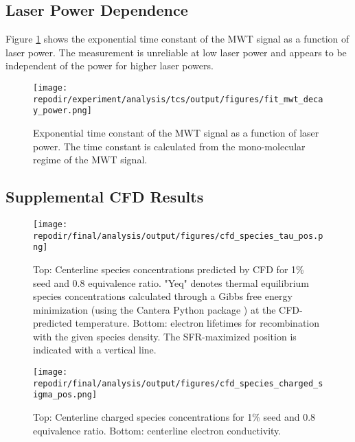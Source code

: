\clearpage
\subsection{Laser Power Dependence}

Figure \ref{fig:SI_fit_mwt_decay_power} shows the exponential time constant of the MWT signal as a function of laser power. The measurement is unreliable at low laser power and appears to be independent of the power for higher laser powers.

\begin{figure}
    \centering
    \texttt{[image: \\repodir/experiment/analysis/tcs/output/figures/fit\_mwt\_decay\_power.png]} 
    \caption{Exponential time constant of the MWT signal as a function of laser power. The time constant is calculated from the mono-molecular regime of the MWT signal.}
    \label{fig:SI_fit_mwt_decay_power}
\end{figure}

\clearpage

\subsection{Supplemental CFD Results}

\begin{figure}[h]
    \texttt{[image: \\repodir/final/analysis/output/figures/cfd\_species\_tau\_pos.png]} 
    \caption{Top: Centerline species concentrations predicted by CFD for 1\% seed and 0.8 equivalence ratio. "Yeq" denotes thermal equilibrium species concentrations calculated through a Gibbs free energy minimization (using the Cantera Python package \cite{goodwinCanteraObjectorientedSoftware2021}) at the CFD-predicted temperature.  Bottom: electron lifetimes for recombination with the given species density. The SFR-maximized position is indicated with a vertical line.}
    \label{fig:SI_cfd_species_tau_pos}
\end{figure}



\begin{figure}[h]
    \texttt{[image: \\repodir/final/analysis/output/figures/cfd\_species\_charged\_sigma\_pos.png]} 
    \caption{Top: Centerline charged species concentrations for 1\% seed and 0.8 equivalence ratio. Bottom: centerline electron conductivity.}
    \label{fig:SI_cfd_species_charged_sigma_pos}
\end{figure}



\clearpage

